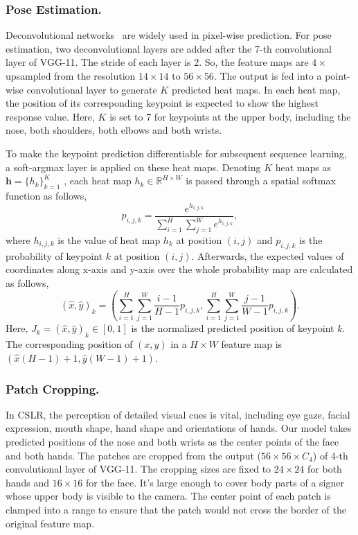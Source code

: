 \documentclass[letterpaper]{article} \usepackage{aaai20}  \usepackage{times}  \usepackage{helvet} \usepackage{courier}  \usepackage[hyphens]{url}  \usepackage{graphicx} \urlstyle{rm} \def\UrlFont{\rm}  \usepackage{graphicx}  \frenchspacing  \setlength{\pdfpagewidth}{8.5in}  \setlength{\pdfpageheight}{11in}
\begin{document}
\subsubsection{Pose Estimation.}
Deconvolutional networks~\cite{deconv} are widely used in pixel-wise prediction. For pose estimation, two deconvolutional layers are added after the 7-th convolutional layer of VGG-11. The stride of each layer is 2. So, the feature maps are $4\times$ upsampled from the resolution $14\times14$ to $56\times56$. The output is fed into a point-wise convolutional layer to generate $K$ predicted heat maps. In each heat map, the position of its corresponding keypoint is expected to show the highest response value. Here, $K$ is set to 7 for keypoints at the upper body, including the nose, both shoulders, both elbows and both wrists. 

To make the keypoint prediction differentiable for subsequent sequence learning, a soft-argmax layer is applied on these heat maps. Denoting $K$ heat maps as $\mathbf{h}=\{h_k\}_{k=1}^K$ , each heat map $h_k\in \mathbb{R}^{H\times W}$ is passed through a spatial softmax function as follows, 
\begin{equation} 
    p_{i,j,k}=\frac{e^{h_{i,j,k}}}{\sum_{i=1}^{H}{\sum_{j=1}^{W}{ e^{h_{i,j,k}} }} },
\end{equation}
where $h_{i,j,k}$ is the value of heat map $h_k$ at position $(i,j)$ and $p_{i, j, k}$ is the probability of keypoint $k$ at position $(i, j)$. Afterwards, the expected values of coordinates along x-axis and y-axis over the whole probability map are calculated as follows,
\begin{equation}
    (\hat{x}, \hat{y})_k \!=\! \left(\sum_{i=1}^{H}{\sum_{j=1}^{W}{ \frac{i\!-\!1}{H\!-\!1} p_{i,j,k} }}, \sum_{i=1}^{H}{\sum_{j=1}^{W}{ \frac{j\!-\!1}{W\!-\!1} p_{i,j,k} }}\right).
\end{equation}
Here, $J_k\!=\!(\hat{x},\hat{y})_k\in[0,1]$ is the normalized predicted position of keypoint $k$. The corresponding position of $(x, y)$ in a $H\times W$ feature map is $\left(\hat{x}(H\!-\!1)+1, \hat{y}(W\!-\!1)+1 \right)$.

\subsubsection{Patch Cropping.}
In CSLR, the perception of detailed visual cues is vital, including eye gaze, facial expression, mouth shape, hand shape and orientations of hands. 
Our model takes predicted positions of the nose and both wrists as the center points of the face and both hands. 
The patches are cropped from the output ($56\times 56\times C_4$) of 4-th convolutional layer of VGG-11. The cropping sizes are fixed to $24\times 24$ for both hands and $16\times16$ for the face. It's large enough to cover body parts of a signer whose upper body is visible to the camera. The center point of each patch is clamped into a range to ensure that the patch would not cross the border of the original feature map.
\end{document}
